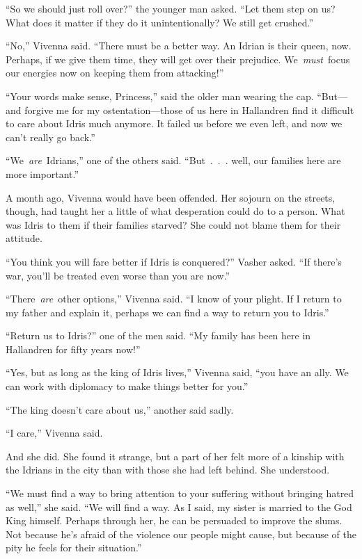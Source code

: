 “So we should just roll over?” the younger man asked. “Let them step on us? What does it matter if they do it unintentionally? We still get crushed.”

“No,” Vivenna said. “There must be a better way. An Idrian is their queen, now. Perhaps, if we give them time, they will get over their prejudice. We~\textit{must}~focus our energies now on keeping them from attacking!”

“Your words make sense, Princess,” said the older man wearing the cap. “But—and forgive me for my ostentation—those of us here in Hallandren find it difficult to care about Idris much anymore. It failed us before we even left, and now we can’t really go back.”

“We~\textit{are}~Idrians,” one of the others said. “But~.~.~. well, our families here are more important.”

A month ago, Vivenna would have been offended. Her sojourn on the streets, though, had taught her a little of what desperation could do to a person. What was Idris to them if their families starved? She could not blame them for their attitude.

“You think you will fare better if Idris is conquered?” Vasher asked. “If there’s war, you’ll be treated even worse than you are now.”

“There~\textit{are}~other options,” Vivenna said. “I know of your plight. If I return to my father and explain it, perhaps we can find a way to return you to Idris.”

“Return us to Idris?” one of the men said. “My family has been here in Hallandren for fifty years now!”

“Yes, but as long as the king of Idris lives,” Vivenna said, “you have an ally. We can work with diplomacy to make things better for you.”

“The king doesn’t care about us,” another said sadly.

“I care,” Vivenna said.

And she did. She found it strange, but a part of her felt more of a kinship with the Idrians in the city than with those she had left behind. She understood.

“We must find a way to bring attention to your suffering without bringing hatred as well,” she said. “We will find a way. As I said, my sister is married to the God King himself. Perhaps through her, he can be persuaded to improve the slums. Not because he’s afraid of the violence our people might cause, but because of the pity he feels for their situation.”

